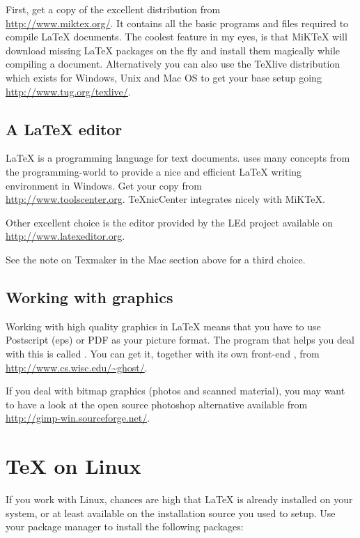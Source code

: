 First, get a copy of the excellent  distribution from\\
\url{http://www.miktex.org/}. It contains all the basic programs and files
required to compile \LaTeX{} documents.  The coolest feature in my eyes, is
that MiKTeX will download missing \LaTeX{} packages on the fly and install them
magically while compiling a document. Alternatively you can also use
the TeXlive distribution which exists for Windows, Unix and Mac OS to
get your base setup going \url{http://www.tug.org/texlive/}.

\subsection{A \LaTeX{} editor}

\LaTeX{} is a programming language for text documents. 
uses many concepts from the programming-world to provide a nice and
efficient \LaTeX{} writing environment in Windows. Get your copy from\\
\url{http://www.toolscenter.org}. TeXnicCenter integrates nicely with
MiKTeX.

Other excellent choice is the editor provided by the LEd project available
on \url{http://www.latexeditor.org}.

See the note on Texmaker in the Mac section above for a third choice.

\subsection{Working with graphics}

Working with high quality graphics in \LaTeX{} means that you have to use
Postscript (eps) or PDF as your picture format. The program that helps you
deal with this is called . You can get it, together with its
own front-end , from \url{http://www.cs.wisc.edu/~ghost/}.

If you deal with bitmap graphics (photos and scanned material), you may want
to have a look at the open source photoshop alternative  available
from \url{http://gimp-win.sourceforge.net/}.

\section{\TeX{} on Linux}

If you work with Linux, chances are high that \LaTeX{} is already installed
on your system, or at least available on the installation source you used to
setup. Use your package manager to install the following packages:


